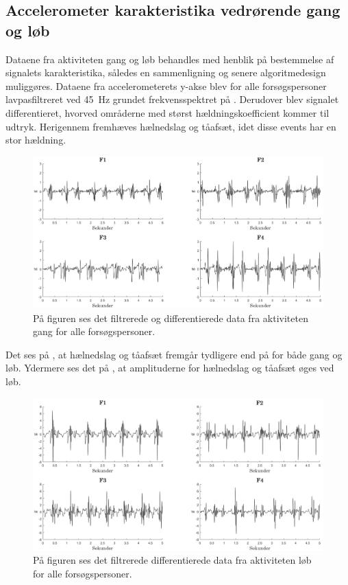 \subsection{Accelerometer karakteristika vedrørende gang og løb}
Dataene fra aktiviteten gang og løb behandles med henblik på bestemmelse af signalets karakteristika, således en sammenligning og senere algoritmedesign muliggøres. Dataene fra accelerometerets y-akse blev for alle forsøgspersoner lavpasfiltreret ved 45~Hz grundet frekvensspektret på . Derudover blev signalet differentieret, hvorved områderne med størst hældningskoefficient kommer til udtryk. Herigennem fremhæves hælnedslag og tåafsæt, idet disse events har en stor hældning.
\begin{figure}[H]
	\centering
	\includegraphics[width=1\textwidth]{figures/qBilag/gang_diff}
	\caption{På figuren ses det filtrerede og differentierede data fra aktiviteten gang for alle forsøgspersoner.}
	\label{fig:Ap_gangdiff}
\end{figure}\vspace{-.25cm}
Det ses på , at hælnedslag og tåafsæt fremgår tydligere end på  for både gang og løb. Ydermere ses det på , at amplituderne for hælnedslag og tåafsæt øges ved løb.
\begin{figure}[H]
	\centering
	\includegraphics[width=1\textwidth]{figures/qBilag/loeb_diff}
	\caption{På figuren ses det filtrerede differentierede data fra aktiviteten løb for alle forsøgspersoner.}
	\label{fig:Ap_loebdiff}
\end{figure}\vspace{-.25cm}

